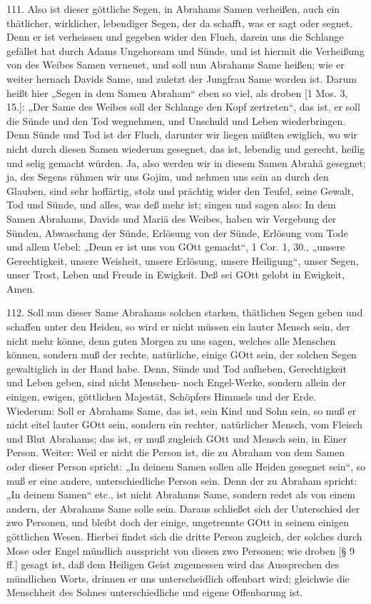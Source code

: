 111. Also ist dieser göttliche Segen, in Abrahams Samen verheißen, auch ein thätlicher, wirklicher, lebendiger Segen, der da schafft, was er sagt oder segnet. Denn er ist verheissen und gegeben wider den Fluch, darein uns die Schlange gefället hat durch Adams Ungehorsam und Sünde, und ist hiermit die Verheißung von des Weibes Samen verneuet, und soll nun Abrahams Same heißen; wie er weiter hernach Davids Same, und zuletzt der Jungfrau Same worden ist. Darum heißt hier „Segen in dem Samen Abraham“ eben so viel, als droben [1 Mos. 3, 15.]: „Der Same des Weibes soll der Schlange den Kopf zertreten“, das ist, er soll die Sünde und den Tod wegnehmen, und Unschuld und Leben wiederbringen. Denn Sünde und Tod ist der Fluch, darunter wir liegen müßten ewiglich, wo wir nicht durch diesen Samen wiederum gesegnet, das ist, lebendig und gerecht, heilig und selig gemacht würden. Ja, also werden wir in diesem Samen Abrahä gesegnet; ja, des Segens rühmen wir uns Gojim, und nehmen uns sein an durch den Glauben, sind sehr hoffärtig, stolz und prächtig wider den Teufel, seine Gewalt, Tod und Sünde, und alles, was deß mehr ist; singen und sagen also: In dem Samen Abrahams, Davids und Mariä des Weibes, haben wir Vergebung der Sünden, Abwaschung der Sünde, Erlösung von der Sünde, Erlösung vom Tode und allem Uebel: „Denn er ist uns von GOtt gemacht“, 1 Cor. 1, 30., „unsere Gerechtigkeit, unsere Weisheit, unsere Erlösung, unsere Heiligung“, unser Segen, unser Trost, Leben und Freude in Ewigkeit. Deß sei GOtt gelobt in Ewigkeit, Amen.

112. Soll nun dieser Same Abrahams solchen
starken, thätlichen Segen geben und schaffen unter den Heiden, so wird er nicht müssen ein lauter Mensch sein, der nicht mehr könne, denn guten Morgen zu uns sagen, welches alle Menschen können, sondern muß der rechte, natürliche, einige GOtt sein, der solchen Segen gewaltiglich in der Hand habe. Denn, Sünde und Tod aufheben, Gerechtigkeit und Leben geben, sind nicht Menschen- noch Engel-Werke, sondern allein der einigen, ewigen, göttlichen Majestät, Schöpfers Himmels und der Erde. Wiederum: Soll er Abrahams Same, das ist, sein Kind und Sohn sein, so muß er nicht eitel lauter GOtt sein, sondern ein rechter, natürlicher Mensch, vom Fleisch und Blut Abrahams; das ist, er muß zugleich GOtt und Mensch sein, in Einer Person. Weiter: Weil er nicht die Person ist, die zu Abraham von dem Samen oder dieser Person spricht: „In deinem Samen sollen alle Heiden gesegnet sein“, so muß er eine andere, unterschiedliche Person sein. Denn der zu Abraham spricht: „In deinem Samen“ etc., ist nicht Abrahams Same, sondern redet als von einem andern, der Abrahams Same solle sein. Daraus schließet sich der Unterschied der zwo Personen, und bleibt doch der einige, ungetrennte GOtt in seinem einigen göttlichen Wesen. Hierbei findet sich die dritte Person zugleich, der solches durch Mose oder Engel mündlich ausspricht von diesen zwo Personen; wie droben [§ 9 ff.] gesagt ist, daß dem Heiligen Geist zugemessen wird das Aussprechen des mündlichen Worts, drinnen er uns unterscheidlich offenbart wird; gleichwie die Menschheit des Sohnes unterschiedliche und eigene Offenbarung ist.

